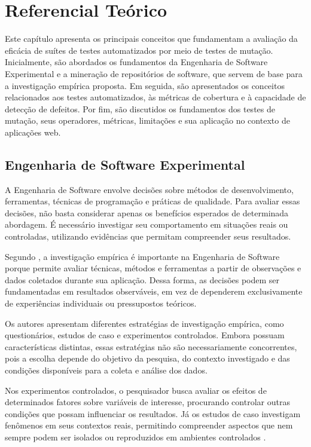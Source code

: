 \chapter{Referencial Teórico}

Este capítulo apresenta os principais conceitos que fundamentam a avaliação da eficácia de suítes de testes automatizados por meio de testes de mutação. Inicialmente, são abordados os fundamentos da Engenharia de Software Experimental e a mineração de repositórios de software, que servem de base para a investigação empírica proposta. Em seguida, são apresentados os conceitos relacionados aos testes automatizados, às métricas de cobertura e à capacidade de detecção de defeitos. Por fim, são discutidos os fundamentos dos testes de mutação, seus operadores, métricas, limitações e sua aplicação no contexto de aplicações web.


\section{Engenharia de Software Experimental}

A Engenharia de Software envolve decisões sobre métodos de desenvolvimento, ferramentas, técnicas de programação e práticas de qualidade. Para avaliar essas decisões, não basta considerar apenas os benefícios esperados de determinada abordagem. É necessário investigar seu comportamento em situações reais ou controladas, utilizando evidências que permitam compreender seus resultados.

Segundo , a investigação empírica é importante na Engenharia de Software porque permite avaliar técnicas, métodos e ferramentas a partir de observações e dados coletados durante sua aplicação. Dessa forma, as decisões podem ser fundamentadas em resultados observáveis, em vez de dependerem exclusivamente de experiências individuais ou pressupostos teóricos.

Os autores apresentam diferentes estratégias de investigação empírica, como questionários, estudos de caso e experimentos controlados. Embora possuam características distintas, essas estratégias não são necessariamente concorrentes, pois a escolha depende do objetivo da pesquisa, do contexto investigado e das condições disponíveis para a coleta e análise dos dados.

Nos experimentos controlados, o pesquisador busca avaliar os efeitos de determinados fatores sobre variáveis de interesse, procurando controlar outras condições que possam influenciar os resultados. Já os estudos de caso investigam fenômenos em seus contextos reais, permitindo compreender aspectos que nem sempre podem ser isolados ou reproduzidos em ambientes controlados \cite{wohlin2015}.

